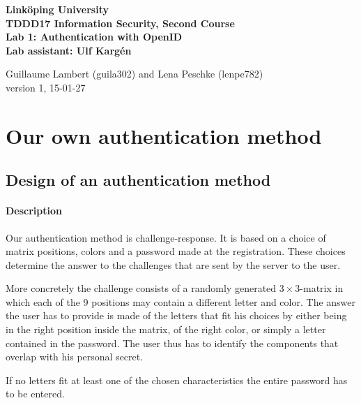 \documentclass[11pt,a4paper]{article}
\begin{document}
	
\begin{center}
{\bfseries
Linköping University\\
TDDD17 Information Security, Second Course\\

Lab 1: Authentication with OpenID\\
Lab assistant: Ulf Kargén\\[10pt]}

Guillaume Lambert (guila302) and Lena Peschke (lenpe782)\\
version 1, 15-01-27
\end{center}

\hrulefill


\section*{Our own authentication method}
\subsection*{Design of an authentication method}
\paragraph{Description}

Our authentication method is challenge-response. It is based on a choice of matrix positions, colors and a password made at the registration.
These choices determine the answer to the challenges that are sent by the server to the user.

More concretely the challenge consists of a randomly generated $3\times3$-matrix in which each of the 9 positions may contain a different letter and color.
The answer the user has to provide is made of the letters that fit his choices by either being in the
right position inside the matrix, of the right color, or simply a letter contained in the password. The user thus has to identify the components that overlap with his personal secret.

If no letters fit at least one of the chosen characteristics the entire password has to be entered.
\end{document}
